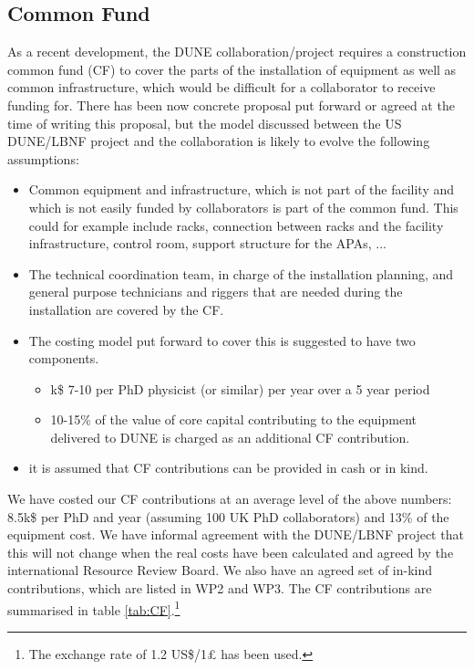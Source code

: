 \subsection{Common Fund}
\label{sec:CF}

As a recent development, the DUNE collaboration/project requires a construction common fund (CF) to cover the parts of the installation of equipment as well as common infrastructure, which would be difficult for a collaborator to receive funding for. There has been now concrete proposal put forward or agreed at the time of writing this proposal, but the model discussed between the US DUNE/LBNF project and the collaboration is likely to evolve the following assumptions:
\begin{itemize}
    \item Common equipment and infrastructure, which is not part of the facility and which is not easily funded by collaborators is part of the common fund. This could for example include racks, connection between racks and the facility infrastructure, control room, support structure for the APAs, ...
    \item The technical coordination team, in charge of the installation planning, and general purpose technicians and riggers that are needed during the installation are covered by the CF.
    \item The costing model put forward to cover this is suggested to have two components.
    \begin{itemize}
        \item k\$ 7-10 per PhD physicist (or similar) per year over a 5 year period
        \item 10-15\% of the value of core capital contributing to the equipment delivered to DUNE is charged as an additional CF contribution.
    \end{itemize}
    \item it is assumed that CF contributions can be provided in cash or in kind.
\end{itemize}
We have costed our CF contributions at an average level of the above numbers: 8.5k\$ per PhD and year (assuming 100 UK PhD collaborators) and 13\% of the equipment cost. We have informal agreement with the DUNE/LBNF project that this will not change when the real costs have been calculated and agreed by the international Resource Review Board. We also have an agreed set of in-kind contributions, which are listed in WP2 and WP3. The CF contributions are summarised in table \ref{tab:CF}.\footnote{The exchange rate of 1.2 US\$/1£ has been used.} 

